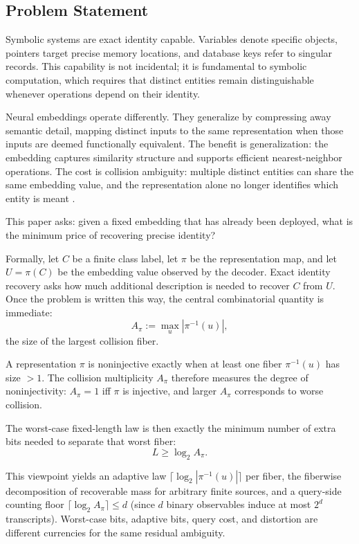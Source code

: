\subsection{Problem Statement}

Symbolic systems are exact identity capable. Variables denote specific objects, pointers target precise memory locations, and database keys refer to singular records. This capability is not incidental; it is fundamental to symbolic computation, which requires that distinct entities remain distinguishable whenever operations depend on their identity.

Neural embeddings operate differently. They generalize by compressing away semantic detail, mapping distinct inputs to the same representation when those inputs are deemed functionally equivalent. The benefit is generalization: the embedding captures similarity structure and supports efficient nearest-neighbor operations. The cost is collision ambiguity: multiple distinct entities can share the same embedding value, and the representation alone no longer identifies which entity is meant \cite{saunshi2019theoretical, higgins2017beta, alemi2017deep, jing2022understanding, wang2020understanding}.

This paper asks: given a fixed embedding that has already been deployed, what is the minimum price of recovering precise identity?

Formally, let $C$ be a finite class label, let $\pi$ be the representation map, and let $U = \pi(C)$ be the embedding value observed by the decoder. Exact identity recovery asks how much additional description is needed to recover $C$ from $U$. Once the problem is written this way, the central combinatorial quantity is immediate:
\[
A_{\pi} := \max_u |\pi^{-1}(u)|,
\]
the size of the largest collision fiber.

\begin{remark}
A representation $\pi$ is noninjective exactly when at least one fiber $\pi^{-1}(u)$ has size $>1$. The collision multiplicity $A_\pi$ therefore measures the degree of noninjectivity: $A_\pi=1$ iff $\pi$ is injective, and larger $A_\pi$ corresponds to worse collision.
\end{remark}

The worst-case fixed-length law is then exactly the minimum number of extra bits needed to separate that worst fiber:
\[
L \ge \log_2 A_{\pi}.
\]

This viewpoint yields an adaptive law $\lceil \log_2 |\pi^{-1}(u)|\rceil$ per fiber, the fiberwise decomposition of recoverable mass for arbitrary finite sources, and a query-side counting floor $\lceil \log_2 A_{\pi}\rceil \le d$ (since $d$ binary observables induce at most $2^d$ transcripts). Worst-case bits, adaptive bits, query cost, and distortion are different currencies for the same residual ambiguity.

